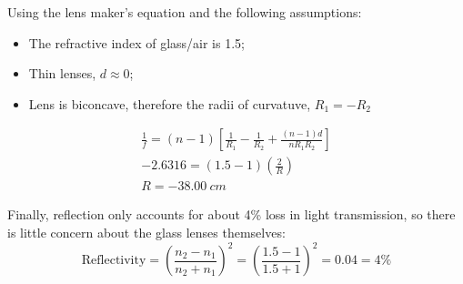Using the lens maker's equation and the following assumptions:
\begin{itemize}
    \item The refractive index of glass/air is 1.5;
    \item Thin lenses, $d \approx 0$;
    \item Lens is biconcave, therefore the radii of curvatuve, $R_1 = -R_2$
\end{itemize}
\begin{equation}
\begin{split}
    \frac{1}{f} = (n-1) \left[
        \frac{1}{R_1} - \frac{1}{R_2} + \frac{(n-1)d}{nR_1R_2}
    \right] \\
    -2.6316 = (1.5-1)(\frac{2}{R}) \\
    R = -\SI{38.00}{cm}
\end{split}
\end{equation}

Finally, reflection only accounts for about 4\% loss in light transmission, so there is little concern about the glass lenses themselves:
\begin{equation}
    \text{Reflectivity} = {\left( \frac{n_2-n_1}{n_2+n_1} \right)}^2 = {\left( \frac{1.5-1}{1.5+1} \right)}^2 = 0.04 = 4\%
\end{equation}
